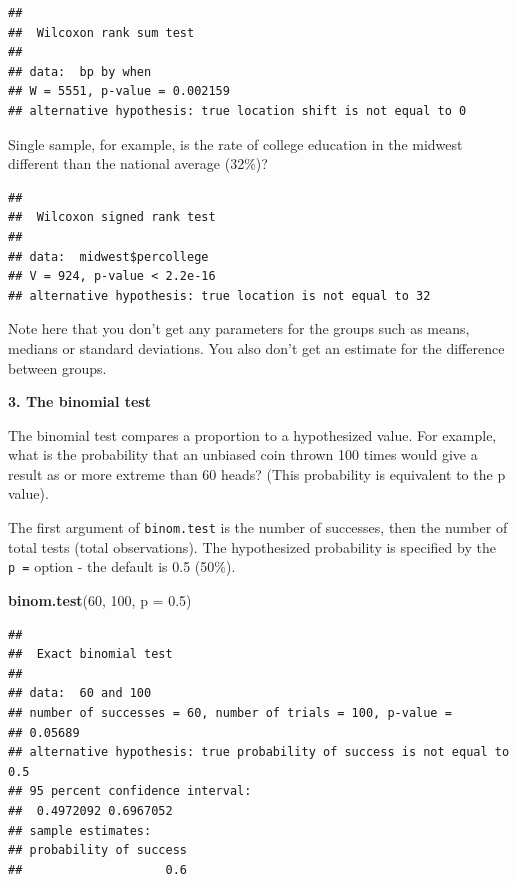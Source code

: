 \documentclass[]{book}
\newenvironment{Shaded}{\begin{snugshade}}{\end{snugshade}}
\newcommand{\DataTypeTok}[1]{\textcolor[rgb]{0.13,0.29,0.53}{#1}}
\newcommand{\DecValTok}[1]{\textcolor[rgb]{0.00,0.00,0.81}{#1}}
\newcommand{\FloatTok}[1]{\textcolor[rgb]{0.00,0.00,0.81}{#1}}
\newcommand{\KeywordTok}[1]{\textcolor[rgb]{0.13,0.29,0.53}{\textbf{#1}}}
\newcommand{\NormalTok}[1]{#1}
\newcommand{\OperatorTok}[1]{\textcolor[rgb]{0.81,0.36,0.00}{\textbf{#1}}}
\newcommand{\OtherTok}[1]{\textcolor[rgb]{0.56,0.35,0.01}{#1}}
\begin{document}
\begin{verbatim}
## 
##  Wilcoxon rank sum test
## 
## data:  bp by when
## W = 5551, p-value = 0.002159
## alternative hypothesis: true location shift is not equal to 0
\end{verbatim}

Single sample, for example, is the rate of college education in the midwest different than the national average (32\%)?

\begin{Shaded}
\end{Shaded}

\begin{verbatim}
## 
##  Wilcoxon signed rank test
## 
## data:  midwest$percollege
## V = 924, p-value < 2.2e-16
## alternative hypothesis: true location is not equal to 32
\end{verbatim}

Note here that you don't get any parameters for the groups such as means, medians or standard deviations. You also don't get an estimate for the difference between groups.

\textbf{3. The binomial test}

The binomial test compares a proportion to a hypothesized value. For example, what is the probability that an unbiased coin thrown 100 times would give a result as or more extreme than 60 heads? (This probability is equivalent to the p value).

The first argument of \texttt{binom.test} is the number of successes, then the number of total tests (total observations). The hypothesized probability is specified by the \texttt{p\ =} option - the default is 0.5 (50\%).

\begin{Shaded}
\begin{Highlighting}[]
\KeywordTok{binom.test}\NormalTok{(}\DecValTok{60}\NormalTok{, }\DecValTok{100}\NormalTok{, }\DataTypeTok{p =} \FloatTok{0.5}\NormalTok{)}
\end{Highlighting}
\end{Shaded}

\begin{verbatim}
## 
##  Exact binomial test
## 
## data:  60 and 100
## number of successes = 60, number of trials = 100, p-value =
## 0.05689
## alternative hypothesis: true probability of success is not equal to 0.5
## 95 percent confidence interval:
##  0.4972092 0.6967052
## sample estimates:
## probability of success 
##                    0.6
\end{verbatim}
\end{document}

